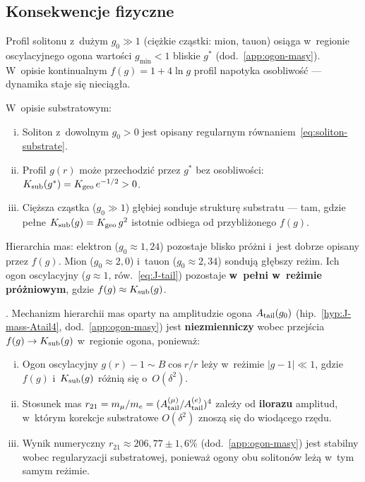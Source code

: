 \subsection{Konsekwencje fizyczne}\label{ssec:physical-consequences}

\begin{remark}%
\label{rem:heavy-solitons-substrate}
Profil solitonu z~dużym $g_0 \gg 1$ (ciężkie cząstki: mion, tauon)
osiąga w~regionie oscylacyjnego ogona wartości
$g_{\min} < 1$ bliskie $g^*$ (dod.~\ref{app:ogon-masy}).
W~opisie kontinualnym $f(g) = 1 + 4\ln g$ profil napotyka
osobliwość --- dynamika staje się nieciągła.

W~opisie substratowym:
\begin{enumerate}[(i)]
  \item Soliton z~dowolnym $g_0 > 0$ jest opisany
    regularnym równaniem~\eqref{eq:soliton-substrate}.
  \item Profil $g(r)$ może przechodzić przez $g^*$
    bez osobliwości: $K_{\rm sub}(g^*) = K_{\rm geo}\,e^{-1/2} > 0$.
  \item Cięższa cząstka ($g_0 \gg 1$) głębiej sonduje
    strukturę substratu --- tam, gdzie pełne $K_{\rm sub}(g) = K_{\rm geo}\,g^2$
    istotnie odbiega od przybliżonego $f(g)$.
\end{enumerate}

Hierarchia mas: elektron ($g_0 \approx 1{,}24$) pozostaje
blisko próżni i~jest dobrze opisany przez $f(g)$.
Mion ($g_0 \approx 2{,}0$) i~tauon ($g_0 \approx 2{,}34$)
sondują głębszy reżim. Ich ogon oscylacyjny ($g \approx 1$,
ró{}w.~\eqref{eq:J-tail}) pozostaje \textbf{w~pełni w~reżimie
próżniowym}, gdzie $f(g) \approx K_{\rm sub}(g)$.
\end{remark}

\begin{proposition}%
\label{prop:Atail-preserved}
.
Mechanizm hierarchii mas oparty na amplitudzie ogona
$A_{\rm tail}(g_0)$ (hip.~\ref{hyp:J-mass-Atail4},
dod.~\ref{app:ogon-masy}) jest \textbf{niezmienniczy}
wobec przejścia $f(g) \to K_{\rm sub}(g)$
w~regionie ogona, ponieważ:
\begin{enumerate}[(i)]
  \item Ogon oscylacyjny $g(r) - 1 \sim B\cos r/r$
    leży w~reżimie $|g - 1| \ll 1$, gdzie
    $f(g)$ i~$K_{\rm sub}(g)$ różnią się o~$O(\delta^2)$.
  \item Stosunek mas $r_{21} = m_\mu/m_e
    = (A_{\rm tail}^{(\mu)}/A_{\rm tail}^{(e)})^4$
    zależy od \textbf{ilorazu} amplitud,
    w~którym korekcje substratowe $O(\delta^2)$
    znoszą się do wiodącego rzędu.
  \item Wynik numeryczny $r_{21} \approx 206{,}77 \pm 1{,}6\%$
    (dod.~\ref{app:ogon-masy}) jest stabilny wobec
    regularyzacji substratowej, ponieważ
    ogony obu solitonów leżą w~tym samym reżimie.
\end{enumerate}
\end{proposition}

